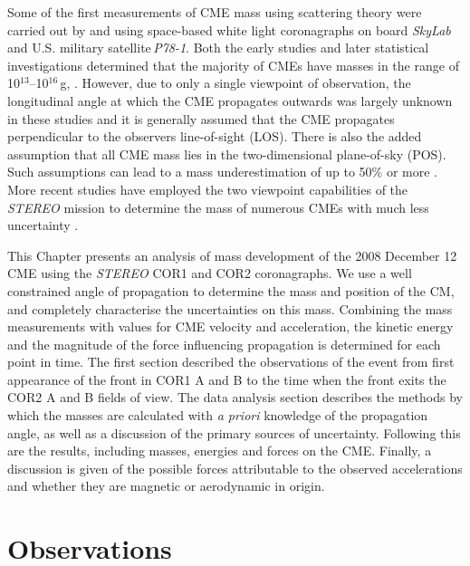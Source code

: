 Some of the first measurements of CME mass using scattering theory were carried out by \citet{munro1979} and \citet{poland1981} using space-based white light coronagraphs on board \emph{SkyLab} and U.S. military satellite\,\emph{P78-1}.  Both the early studies  and later statistical investigations determined that the majority of CMEs have masses in the range of 10$^{13}$--10$^{16}$\,g, \citep{vourlidas02, vour2010}. However, due to only a single viewpoint of observation, the longitudinal angle at which the CME propagates outwards was largely unknown in these studies 
and it is generally assumed that the CME propagates perpendicular to the observers line-of-sight (LOS). There is also the added assumption that all CME mass lies in the two-dimensional plane-of-sky (POS). Such assumptions can lead to a mass underestimation of up to 50\% or more \citep{vou00}. More recent studies have employed the two viewpoint capabilities of the \emph{STEREO} mission to determine the mass of numerous 
CMEs with much less uncertainty \citep{cola09}. 
	
This Chapter presents an analysis of mass development of the 2008 December 12 CME using the \emph{STEREO} COR1 and COR2 coronagraphs. We use a well constrained angle of propagation to determine the mass and position of the CM, and completely characterise the uncertainties on this mass. Combining the mass measurements with values for CME velocity and acceleration, the kinetic energy and the magnitude of the force influencing propagation is determined for each point in time. The first section described the observations of the event from first appearance of the front in COR1 A and B to the time when the front exits the COR2 A and B fields of view. 
The data analysis section describes the methods by which the masses are calculated with \emph{a priori} knowledge of the propagation angle, as well as a discussion of the primary sources of uncertainty. Following this are the results, including masses, energies and forces on the CME. Finally, a discussion is given of the possible forces attributable to the observed accelerations and whether they are magnetic or aerodynamic in origin. 

\section{Observations}

